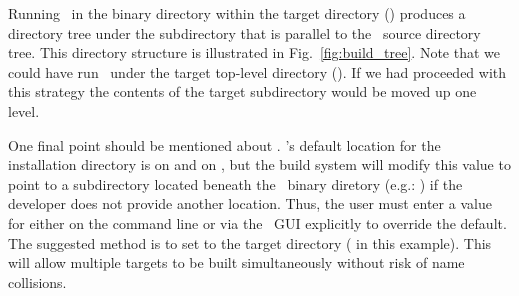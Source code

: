 
Running \cmake\ in the  binary directory within the target
directory () produces a directory tree under
the  subdirectory that is parallel to the \draco\ source
directory tree.  This directory structure is illustrated in
Fig.~\ref{fig:build_tree}.  Note that we could have run \cmake\ 
under the target top-level directory ().  If we had
proceeded with this strategy the contents of the \comp{draco/} target
subdirectory would be moved up one level.

One final point should be mentioned about .  \cmake's
default location for the installation directory is
 on  and  on , but the build system will modify this value to point to a  subdirectory located beneath the \draco\ binary diretory (e.g.: ) if the developer does not provide another location.  Thus, the user must enter a value for  either on the command line or via the \cmake\ GUI 
explicitly to override the default.  The suggested method is to set
\comp{CMAKE\_INSTALL\_PREFIX} to the target directory ( in this
example).  This will allow multiple targets to be built simultaneously 
without risk of name collisions.

